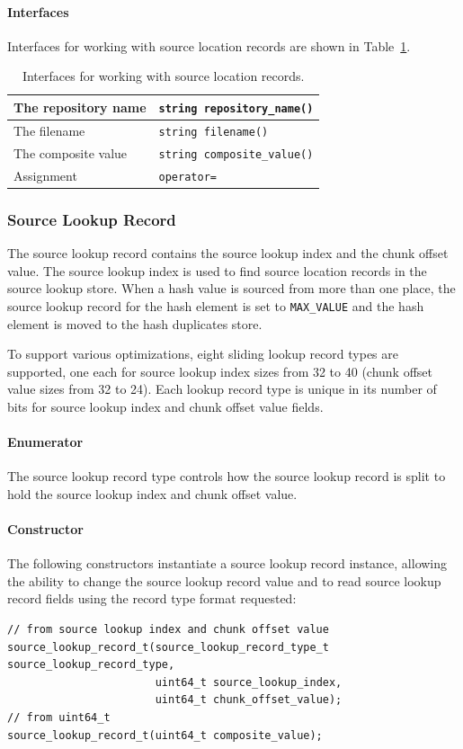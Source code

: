 \documentclass[12pt,twoside]{article}
\begin{document}
\paragraph{Interfaces}
Interfaces for working with source location records
are shown in Table~\ref{source-location-interfaces}.
\begin{table}[h]
\center
\begin{tabular}{|p{2in}|p{4in}|}
\hline
The repository name & \texttt{string repository\_name()} \\
\hline
The filename & \texttt{string filename()} \\
\hline
The composite value & \texttt{string composite\_value()} \\
\hline
Assignment & \texttt{operator=} \\
\hline
\end{tabular}
\caption{Interfaces for working with source location records.\label{source-location-interfaces}}
\end{table}

\subsubsection{Source Lookup Record\label{source-lookup-record}}
The source lookup record contains the source lookup index and the chunk offset value.
The source lookup index is used to find source location records in the source lookup store.
When a hash value is sourced from more than one place,
the source lookup record for the hash element is set to \texttt{MAX\_VALUE}
and the hash element is moved to the hash duplicates store.

To support various optimizations,
eight sliding lookup record types are supported,
one each for source lookup index sizes from 32 to 40
(chunk offset value sizes from 32 to 24).
Each lookup record type is unique in its number of bits
for source lookup index and chunk offset value fields.

\paragraph{Enumerator}
The source lookup record type controls how the source lookup record
is split to hold the source lookup index and chunk offset value.

\paragraph{Constructor}
The following constructors instantiate a source lookup record instance,
allowing the ability to change the source lookup record value
and to read source lookup record fields using the record type format requested:
\begin{small}
\begin{verbatim}
// from source lookup index and chunk offset value
source_lookup_record_t(source_lookup_record_type_t source_lookup_record_type,
                       uint64_t source_lookup_index,
                       uint64_t chunk_offset_value);
// from uint64_t
source_lookup_record_t(uint64_t composite_value);
\end{verbatim}
\end{small}
\end{document}
